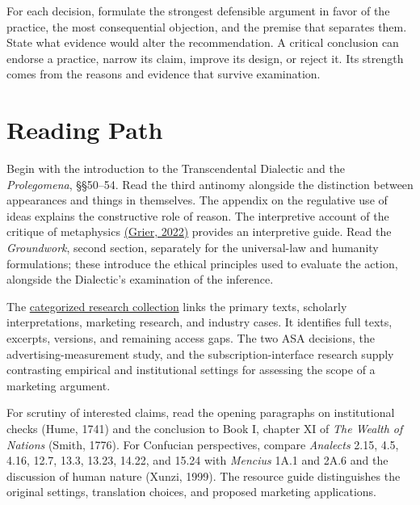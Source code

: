 For each decision, formulate the strongest defensible argument in favor
of the practice, the most consequential objection, and the premise that
separates them. State what evidence would alter the recommendation. A
critical conclusion can endorse a practice, narrow its claim, improve
its design, or reject it. Its strength comes from the reasons and
evidence that survive examination.


\hypertarget{M09-reading-path}{%
\section{Reading Path}\label{M09-reading-path}}

\noindent \noindent Begin with the introduction to the Transcendental Dialectic
and the \emph{Prolegomena}, §§50--54. Read the third antinomy alongside
the distinction between appearances and things in themselves. The
appendix on the regulative use of ideas explains the constructive role
of reason. The interpretive account of the critique of metaphysics
\href{https://plato.stanford.edu/entries/kant-metaphysics/}{(Grier,
2022)} provides an interpretive guide. Read the \emph{Groundwork},
second section, separately for the universal-law and humanity
formulations; these introduce the ethical principles used to evaluate
the action, alongside the Dialectic's examination of the inference.

The \href{../01_Resources/15_Marketing_Dialectics/README.md}{categorized
research collection} links the primary texts, scholarly interpretations,
marketing research, and industry cases. It identifies full texts,
excerpts, versions, and remaining access gaps. The two ASA decisions,
the advertising-measurement study, and the subscription-interface
research supply contrasting empirical and institutional settings for
assessing the scope of a marketing argument.

For scrutiny of interested claims, read the opening paragraphs on
institutional checks (Hume, 1741) and the conclusion to Book I, chapter
XI of \emph{The Wealth of Nations} (Smith, 1776). For Confucian
perspectives, compare \emph{Analects} 2.15, 4.5, 4.16, 12.7, 13.3,
13.23, 14.22, and 15.24 with \emph{Mencius} 1A.1 and 2A.6 and the
discussion of human nature (Xunzi, 1999). The resource guide
distinguishes the original settings, translation choices, and proposed
marketing applications.


